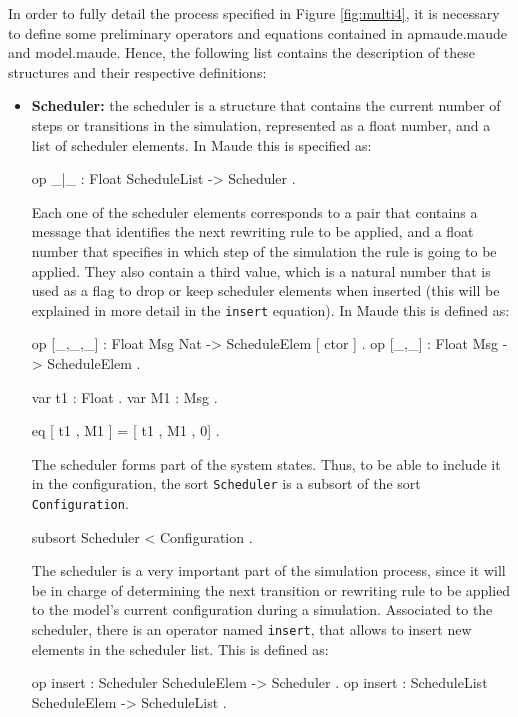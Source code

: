 In order to fully detail the process specified in Figure \ref{fig:multi4}, it is necessary to define some preliminary operators and equations contained in apmaude.maude and model.maude. Hence, the following list contains the description of these structures and their respective definitions:
\begin{itemize}
    \item \textbf{Scheduler:} the scheduler is a structure that contains the current number of steps or transitions in the simulation, represented as a float number, and a list of scheduler elements. In Maude this is specified as:
    \begin{maude}

op {_|_} : Float ScheduleList -> Scheduler . \end{maude}
    Each one of the scheduler elements corresponds to a pair that contains a message that identifies the next rewriting rule to be applied, and a float number that specifies in which step of the simulation the rule is going to be applied. They also contain a third value, which is a natural number that is used as a flag to drop or keep scheduler elements when inserted (this will be explained in more detail in the \texttt{insert} equation). In Maude this is defined as:
    \begin{maude}
    
op [_,_,_] : Float Msg Nat -> ScheduleElem [ ctor ] .
op [_,_] : Float Msg -> ScheduleElem .

var t1 : Float .
var M1 : Msg .

eq [ t1 , M1 ] = [ t1 , M1 , 0] . \end{maude}
    The scheduler forms part of the system states. Thus, to be able to include it in the configuration, the sort \texttt{Scheduler} is a subsort of the sort \texttt{Configuration}.
    \begin{maude}
    
subsort Scheduler < Configuration . \end{maude}
    
    The scheduler is a very important part of the simulation process, since it will be in charge of determining the next transition or rewriting rule to be applied to the model's current configuration during a simulation. Associated to the scheduler, there is an operator named \texttt{insert}, that allows to insert new elements in the scheduler list. This is defined as:
    \begin{maude}
    
op insert : Scheduler ScheduleElem -> Scheduler .
op insert : ScheduleList ScheduleElem -> ScheduleList .  


\end{maude}
\end{itemize}
